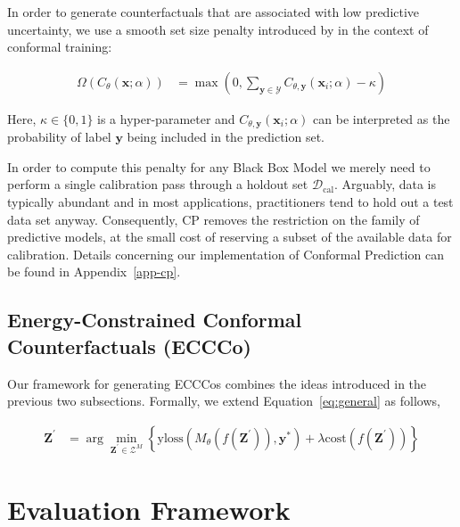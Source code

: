 \documentclass{article}
\begin{document}
In order to generate counterfactuals that are associated with low predictive uncertainty, we use a smooth set size penalty introduced by \citet{stutz2022learning} in the context of conformal training:

\begin{equation}\label{eq:setsize}
  \begin{aligned}
    \Omega(C_{\theta}(\mathbf{x};\alpha))&=\max \left(0, \sum_{\mathbf{y}\in\mathcal{Y}}C_{\theta,\mathbf{y}}(\mathbf{x}_i;\alpha) - \kappa \right)
  \end{aligned}
\end{equation}

Here, $\kappa \in \{0,1\}$ is a hyper-parameter and $C_{\theta,\mathbf{y}}(\mathbf{x}_i;\alpha)$ can be interpreted as the probability of label $\mathbf{y}$ being included in the prediction set. 

In order to compute this penalty for any Black Box Model we merely need to perform a single calibration pass through a holdout set $\mathcal{D}_{\text{cal}}$. Arguably, data is typically abundant and in most applications, practitioners tend to hold out a test data set anyway. Consequently, CP removes the restriction on the family of predictive models, at the small cost of reserving a subset of the available data for calibration. Details concerning our implementation of Conformal Prediction can be found in Appendix~\ref{app-cp}.

\subsection{Energy-Constrained Conformal Counterfactuals (ECCCo)}

Our framework for generating ECCCos combines the ideas introduced in the previous two subsections. Formally, we extend Equation~\ref{eq:general} as follows,

\begin{equation} \label{eq:eccco}
  \begin{aligned}
  \mathbf{Z}^\prime &= \arg \min_{\mathbf{Z}^\prime \in \mathcal{Z}^M} \left\{  {\text{yloss}(M_{\theta}(f(\mathbf{Z}^\prime)),\mathbf{y}^*)}+ \lambda {\text{cost}(f(\mathbf{Z}^\prime)) }  \right\} 
  \end{aligned} 
\end{equation}

\section{Evaluation Framework}\label{conformity}
\end{document}
